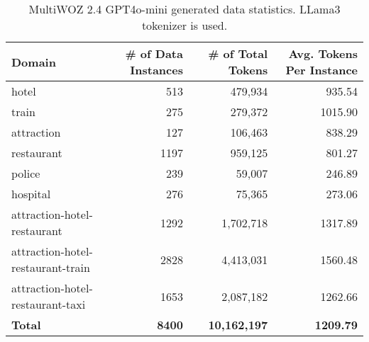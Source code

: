 \begin{table*}[!h]
\centering
\begin{tabular}{lrrr}
\toprule
\textbf{Domain}                     & \textbf{\# of Data Instances} &  \textbf{\# of Total Tokens} & \textbf{Avg. Tokens Per Instance} \\ \midrule
hotel                               & 513                           & 479,934                      & 935.54 \\
train                               & 275                           & 279,372                      & 1015.90 \\
attraction                          & 127                           & 106,463                      & 838.29 \\
restaurant                          & 1197                          & 959,125                      & 801.27 \\ 
police                              & 239                           & 59,007                       & 246.89 \\ 
hospital                            & 276                           & 75,365                       & 273.06 \\ 
attraction-hotel-restaurant         & 1292                          & 1,702,718                    & 1317.89 \\
attraction-hotel-restaurant-train   & 2828                          & 4,413,031                    & 1560.48 \\
attraction-hotel-restaurant-taxi    & 1653                          & 2,087,182                    & 1262.66 \\ \midrule
\textbf{Total} & \textbf{8400} & \textbf{10,162,197} & \textbf{1209.79} \\ \bottomrule

\end{tabular}
\caption{MultiWOZ 2.4 GPT4o-mini generated data statistics. LLama3 tokenizer is used.}
\label{tab:my_label}
\end{table*}

